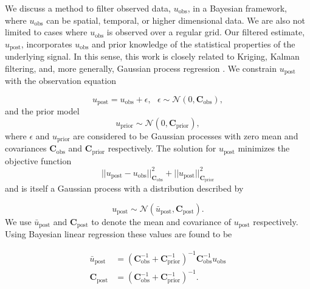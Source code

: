 \documentclass[10pt,a4paper]{article}
\begin{document}
We discuss a method to filter observed data, $u_\mathrm{obs}$, in a Bayesian framework, where $u_\mathrm{obs}$ can be spatial, temporal, or higher dimensional data.  We are also not limited to cases where $u_\mathrm{obs}$ is observed over a regular grid. Our filtered estimate, $u_\mathrm{post}$, incorporates $u_\mathrm{obs}$ and prior knowledge of the statistical properties of the underlying signal.  In this sense, this work is closely related to Kriging, Kalman filtering, and, more generally, Gaussian process regression \citep[e.g][]{Rasmussen2006} .  We constrain $u_\mathrm{post}$ with the observation equation

\begin{equation}\label{eq:Data}
  u_\mathrm{post} = u_\mathrm{obs} + \epsilon,\ \ \ \epsilon \sim \mathcal{N}(0,\mathbf{C}_\mathrm{obs}),
\end{equation}
and the prior model
\begin{equation}\label{eq:Prior}
  u_\mathrm{prior} \sim \mathcal{N}(0,\mathbf{C}_\mathrm{prior}),
\end{equation}
where $\epsilon$ and $u_\mathrm{prior}$ are considered to be Gaussian processes with zero mean and covariances $\mathbf{C}_\mathrm{obs}$ and $\mathbf{C}_\mathrm{prior}$ respectively.  The solution for $u_\mathrm{post}$ minimizes the objective function  
\begin{equation}\label{eq:Objective}
||u_\mathrm{post} - u_\mathrm{obs}||_{\mathbf{C}_\mathrm{obs}}^2 + 
||u_\mathrm{post}||_{\mathbf{C}_\mathrm{prior}}^2
\end{equation}
and is itself a Gaussian process with a distribution described by

\begin{equation}
  u_\mathrm{post} \sim \mathcal{N}(\bar{u}_\mathrm{post},\mathbf{C}_\mathrm{post}).
\end{equation}
We use $\bar{u}_\mathrm{post}$ and $\mathbf{C}_\mathrm{post}$ to denote the mean and covariance of $u_\mathrm{post}$ respectively.  Using Bayesian linear regression \citep[e.g.][]{Tarantola2005} these values are found to be  

\begin{equation}\label{eq:GeneralSolution}
\begin{split}
  \bar{u}_\mathrm{post} &= (\mathbf{C}_\mathrm{obs}^{-1} + 
                            \mathbf{C}_\mathrm{prior}^{-1})^{-1}
                            \mathbf{C}_\mathrm{obs}^{-1} u_\mathrm{obs}
\\
\mathbf{C}_\mathrm{post} &= (\mathbf{C}_\mathrm{obs}^{-1} + 
                             \mathbf{C}_\mathrm{prior}^{-1})^{-1}.                          
\end{split}
\end{equation}
 
\end{document}
